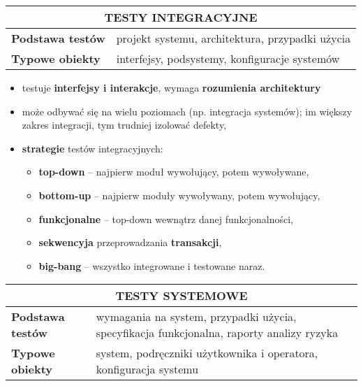 \documentclass[main.tex]{subfiles}
\begin{document}
    \begin{table}[H]
        \begin{center}
            \begin{tabular}{| p{4cm}| p{12cm}|}
                \hline
                \multicolumn{2}{|c|}{ \textbf{TESTY INTEGRACYJNE}}\\
                \hline
                \textbf{Podstawa testów} & projekt systemu, architektura, przypadki użycia\\
                \hline
                \textbf{Typowe obiekty} & interfejsy, podsystemy, konfiguracje systemów\\
                \hline
            \end{tabular}
        \end{center}
    \end{table}

    \begin{itemize}[noitemsep]
        \item testuje \textbf{interfejsy i interakcje}, wymaga \textbf{rozumienia architektury}
        \item może odbywać się na wielu poziomach (np. integracja systemów); im większy zakres integracji, tym trudniej izolować defekty,
        \item \textbf{strategie} testów integracyjnych:
        \begin{itemize}[noitemsep]
            \item \textbf{top-down} -- najpierw moduł wywołujący, potem wywoływane,
            \item \textbf{bottom-up} -- najpierw moduły wywoływany, potem wywołujący,
            \item \textbf{funkcjonalne} -- top-down wewnątrz danej funkcjonalności,
            \item \textbf{sekwencyja} przeprowadzania \textbf{transakcji},
            \item \textbf{big-bang} -- wszystko integrowane i testowane naraz.
        \end{itemize}
    \end{itemize}

    \begin{table}[H]
        \begin{center}
            \begin{tabular}{| p{4cm}| p{12cm}|}
                \hline
                \multicolumn{2}{|c|}{ \textbf{TESTY SYSTEMOWE}}\\
                \hline
                \textbf{Podstawa testów} & wymagania na system, przypadki użycia,
                specyfikacja funkcjonalna, raporty analizy ryzyka\\
                \hline
                \textbf{Typowe obiekty} & system, podręczniki użytkownika i operatora,
                konfiguracja systemu\\
                \hline
            \end{tabular}
        \end{center}
    \end{table}
\end{document}
